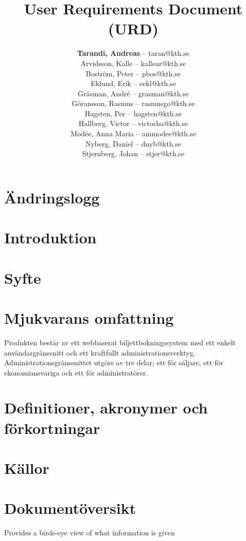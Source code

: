 \documentclass[a4paper, twoside, 11pt, titlepage]{article}
\author{
	\small
	\textbf{Tarandi, Andreas} -- taran@kth.se \\
	Arvidsson, Kalle -- kallear@kth.se\\
	Boström, Peter -- pbos@kth.se\\
	Eklund, Erik -- eekl@kth.se\\
	Gräsman, André -- grasman@kth.se\\
	Göransson, Rasmus -- rasmusgo@kth.se\\
	Hagsten, Per -- hagsten@kth.se\\
	Hallberg, Victor -- victorha@kth.se\\
	Modée, Anna Maria -- ammodee@kth.se\\
	Nyberg, Daniel -- dnyb@kth.se\\
	Stjernberg, Johan -- stjer@kth.se
	}
\title{User Requirements Document (URD)}
\begin{document}
\maketitle

\begin{abstract}
	
\end{abstract}

\newpage

\tableofcontents

\clearpage
\setcounter{page}{1}

\startfooter

\section{Ändringslogg}


\section{Introduktion}


\section{Syfte}


\section{Mjukvarans omfattning}

Produkten består av ett webbaserat biljettbokningssystem med ett enkelt användargränssnitt och ett kraftfullt administrationsverktyg. Administrationsgränssnittet utgörs av tre delar; ett för säljare, ett för ekonomiansvariga och ett för administratörer.

\section{Definitioner, akronymer och förkortningar}


\section{Källor}


\section{Dokumentöversikt}

Provides a birds-eye view of what information is given
\end{document}
